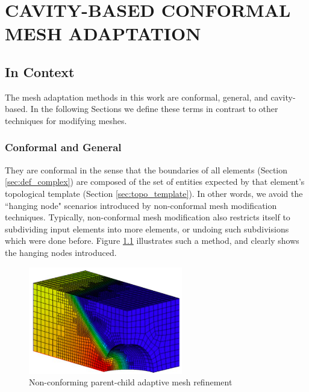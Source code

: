 
\chapter{CAVITY-BASED CONFORMAL MESH ADAPTATION}
\label{chap:adapt}

\section{In Context}

The mesh adaptation methods in this work are
conformal, general, and cavity-based.
In the following Sections we define these
terms in contrast to other techniques for
modifying meshes.

\subsection {Conformal and General}

They are conformal in the sense that the boundaries of all
elements (Section \ref{sec:def_complex}) are composed
of the set of entities expected by that element's
topological template (Section \ref{sec:topo_template}).
In other words, we avoid the ``hanging node" scenarios
introduced by non-conformal mesh modification techniques.
Typically, non-conformal mesh modification also restricts
itself to subdividing input elements into more elements,
or undoing such subdivisions which were done before.
Figure \ref{fig:hex_amr} illustrates such a method,
and clearly shows the hanging nodes introduced.

\begin{figure}
\begin{center}
\includegraphics[width=0.6\textwidth]{hex_amr.png}
\caption{Non-conforming parent-child adaptive mesh refinement
\cite{kirk2006libmesh}}
\label{fig:hex_amr}
\end{center}
\end{figure}

